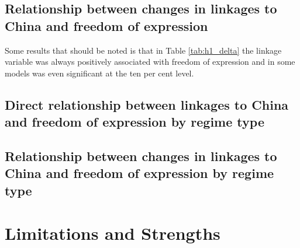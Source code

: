 \subsection{Relationship between changes in linkages to China and freedom of expression}

Some results that should be noted is that in Table \ref{tab:h1_delta} the linkage variable was always positively associated with freedom of expression and in some models was even significant at the ten per cent level. 

\subsection{Direct relationship between linkages to China and freedom of expression by regime type}

\subsection{Relationship between changes in linkages to China and freedom of expression by regime type}

\section{Limitations and Strengths}